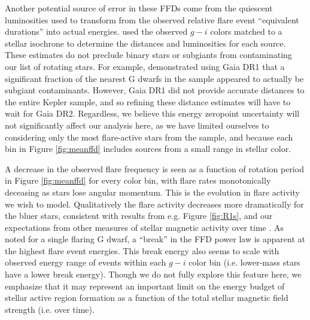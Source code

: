 \documentclass[preprint2]{aastex62}
\begin{document}
Another potential source of error in these FFDs come from the quiescent luminosities used to transform from the observed relative flare event ``equivalent durations'' into actual energies. \citet{davenport2016} used the observed $g-i$ colors matched to a stellar isochrone to determine the distances and luminosities for each source. These estimates do not preclude binary stars or subgiants from contaminating our list of rotating stars. For example, \citet{davenport2017} demonstrated using Gaia DR1 that a significant fraction of the nearest G dwarfs in the \citet{mcquillan2014} sample appeared to actually be subgiant contaminants. However, Gaia DR1 did not provide accurate distances to the entire Kepler sample, and so refining these distance estimates will have to wait for Gaia DR2. Regardless, we believe this energy zeropoint uncertainty will not significantly affect our analysis here, as we have limited ourselves to considering only the most flare-active stars from the \citet{davenport2016} sample, and because each bin in Figure \ref{fig:meanffd} includes sources from a small range in stellar color.


A decrease in the observed flare frequency is seen as a function of rotation period in Figure \ref{fig:meanffd} for every color bin, with flare rates monotonically deceasing as stars lose angular momentum. This is the evolution in flare activity we wish to model. Qualitatively the flare activity decreases more dramatically for the bluer stars, consistent with results from e.g. Figure \ref{fig:R1s}, and our expectations from other measures of stellar magnetic activity over time \citep[e.g.][]{shkolnik2014}. As \citet{davenport2016} noted for a single flaring G dwarf, a ``break'' in the FFD power law is apparent at the highest flare event energies. This break energy also seems to scale with observed energy range of events within each $g-i$ color bin (i.e. lower-mass stars have a lower break energy). Though we do not fully explore this feature here, we emphasize that it may represent an important limit on the energy budget of stellar active region formation as a function of the total stellar magnetic field strength (i.e. over time).


\end{document}
